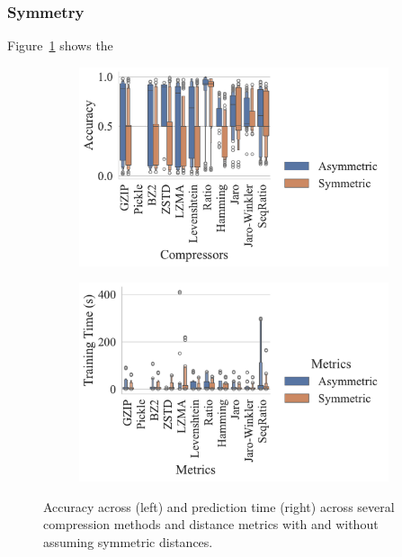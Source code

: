 \subsubsection{Symmetry}

Figure~\ref{fig:kdd_nsl_symmetry} shows the 

\begin{figure}[h!]
    \centering
    \captionsetup[subfigure]{skip=0pt}
    \begin{subfigure}[t]{.44\textwidth}
        \centering
        \includegraphics[width=\textwidth]{figs/kdd_nsl/symmetric_vs_metric.pdf}
    \end{subfigure}
    \begin{subfigure}[t]{.44\textwidth}
        \centering
        \includegraphics[width=\textwidth]{figs/kdd_nsl/symmetric_vs_metric_train_time.pdf}
    \end{subfigure}
    \caption{Accuracy across (left) and prediction time (right) across several compression methods and distance metrics with and without assuming symmetric distances.}
    \label{fig:kdd_nsl_symmetry}
\end{figure}